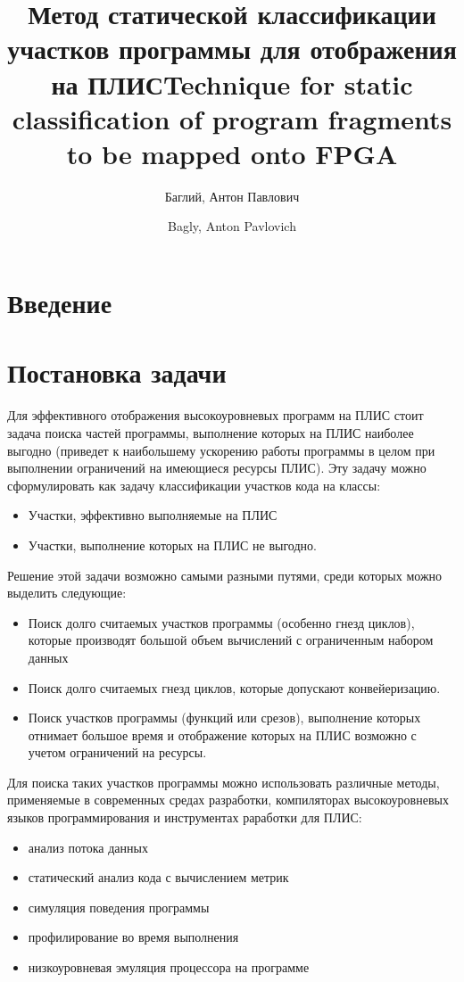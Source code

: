 \documentclass[utf8]{psta}%
\title[Статическая классификация программ для ПЛИС]{Метод статической классификации участков программы для отображения на ПЛИС}
\author{Баглий, Антон Павлович}
\title[Static program classification for FPGA]{Technique for static classification of program fragments to be mapped onto FPGA}
\author{Bagly, Anton Pavlovich}
\begin{document}
           
\maketitle   
\section*{Введение}

\section{Постановка задачи} 

Для эффективного отображения высокоуровневых программ на ПЛИС стоит задача поиска частей программы, выполнение которых на ПЛИС наиболее выгодно (приведет к наибольшему ускорению работы программы в целом при выполнении ограничений на имеющиеся ресурсы ПЛИС).
Эту задачу можно сформулировать как задачу классификации участков кода на классы:

\begin{itemize}
    \item Участки, эффективно выполняемые на ПЛИС
    \item Участки, выполнение которых на ПЛИС не выгодно.
\end{itemize}

Решение этой задачи возможно самыми разными путями, среди которых можно выделить следующие:

\begin{itemize}
    \item Поиск долго считаемых участков программы (особенно гнезд циклов), которые производят большой объем вычислений с ограниченным набором данных
    \item Поиск долго считаемых гнезд циклов, которые допускают конвейеризацию.
    \item Поиск участков программы (функций или срезов), выполнение которых отнимает большое время и отображение которых на ПЛИС возможно с учетом ограничений на ресурсы.
\end{itemize}

Для поиска таких участков программы можно использовать различные методы, применяемые в современных средах разработки, компиляторах высокоуровневых языков программирования и инструментах раработки для ПЛИС:

\begin{itemize}
    \item анализ потока данных
    \item статический анализ кода с вычислением метрик
    \item симуляция поведения программы
    \item профилирование во время выполнения
    \item низкоуровневая эмуляция процессора на программе
\end{itemize}
\end{document}
